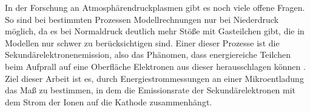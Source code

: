 In der Forschung an Atmosphärendruckplasmen gibt es noch viele offene Fragen. So sind bei bestimmten Prozessen Modellrechnungen nur bei Niederdruck möglich, da es bei Normaldruck deutlich mehr Stöße mit Gasteilchen gibt, die in Modellen nur schwer zu berücksichtigen sind. Einer dieser Prozesse ist die Sekundärelektronenemission, also das Phänomen, dass energiereiche Teilchen beim Aufprall auf eine Oberfläche Elektronen aus dieser herausschlagen können \cite{arumugamEffectiveSecondaryElectron2017}. Ziel dieser Arbeit ist es, durch Energiestrommessungen an einer Mikroentladung das Maß zu bestimmen, in dem die Emissionsrate der Sekundärelektronen mit dem Strom der Ionen auf die Kathode zusammenhängt.